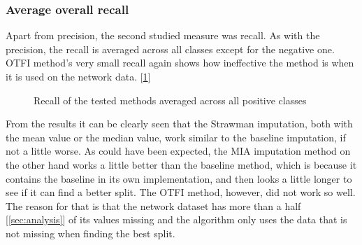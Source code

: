 \documentclass[11pt]{article}
\begin{document}
      \subsubsection{Average overall recall}
        Apart from precision, the second studied measure was recall. As with the precision, the recall is averaged across all classes except for the negative one. OTFI method's very small recall again shows how ineffective the method is when it is used on the network data. [\ref{figure:overall_recall}]
        \begin{figure}
          \centering
          \caption{Recall of the tested methods averaged across all positive classes}
          \label{figure:overall_recall}
        \end{figure}
        \newpage
        From the results it can be clearly seen that the Strawman imputation, both with the mean value or the median value, work similar to the baseline imputation, if not a little worse. As could have been expected, the MIA imputation method on the other hand works a little better than the baseline method, which is because it contains the baseline in its own implementation, and then looks a little longer to see if it can find a better split. The OTFI method, however, did not work so well. The reason for that is that the network dataset has more than a half [\ref{sec:analysis}] of its values missing and the algorithm only uses the data that is not missing when finding the best split.
  \newpage
\end{document}
